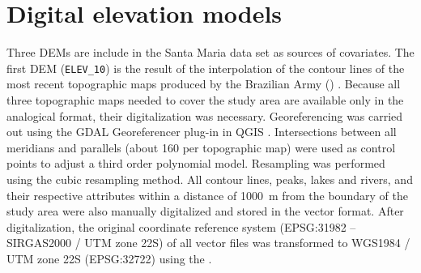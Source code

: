 
\tocless\section{Digital elevation models}
\label{sec:dem}

Three DEMs are include in the Santa Maria data set as sources of covariates. The first DEM 
(\texttt{ELEV\_10}) is the result of the interpolation of the contour lines of the most recent 
topographic maps produced by the Brazilian Army () \cite{DSG1980,DSG1992,DSG1992a}. 
Because all three topographic maps needed to cover the study area are available only in the 
analogical format, their digitalization was necessary. Georeferencing was carried out using the GDAL 
Georeferencer plug-in in QGIS \cite{GDAL2013,QGIS2013}. Intersections between all meridians and 
parallels (about \num{160} per topographic map) were used as control points to adjust a third order 
polynomial model. Resampling was performed using the cubic resampling method. All contour lines, 
peaks, lakes and rivers, and their respective attributes within a distance of \SI{1000}{\metre} 
from the boundary of the study area were also manually digitalized and stored in the vector format. 
After digitalization, the original coordinate reference system (EPSG:31982 -- SIRGAS2000 / UTM 
zone 22S) of all vector files was transformed to WGS1984 / UTM zone 22S (EPSG:32722) using the 
 \cite{BivandEtAl2013a}.

